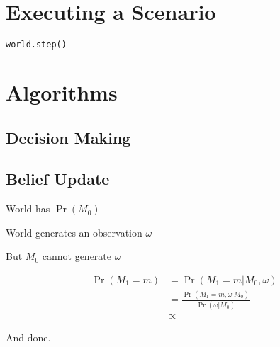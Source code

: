 \documentclass{article}
\begin{document}
\section{Executing a Scenario}

\begin{verbatim}
world.step()
\end{verbatim}

\section{Algorithms}

\subsection{Decision Making}

\subsection{Belief Update}

World has $\Pr(M_0)$

World generates an observation $\omega$

But $M_0$ cannot generate $\omega$

\begin{align}
\Pr(M_1=m)&=\Pr(M_1=m|M_0,\omega)\\
&=\frac{\Pr(M_1=m,\omega|M_0)}{\Pr(\omega|M_0)}\\
&\propto 
\end{align}

And done.
\end{document}
